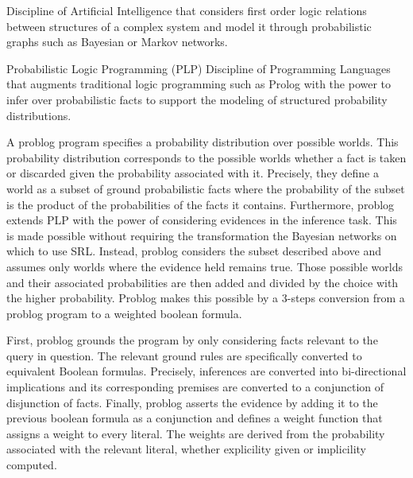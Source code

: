 \begin{definition}
    Discipline of Artificial Intelligence that considers first order logic relations between 
    structures of a complex system and model it through probabilistic graphs such as Bayesian or 
    Markov networks.
\end{definition}

\begin{definition}{Probabilistic Logic Programming (PLP)}
    Discipline of Programming Languages that augments traditional logic programming such as Prolog 
    with the power to infer over probabilistic facts to support the modeling of structured 
    probability distributions.
\end{definition}

A problog program specifies a probability distribution over possible worlds. 
This probability distribution corresponds to the possible worlds whether a fact is taken 
or discarded given the probability associated with it. Precisely, they define a world 
as a subset of ground probabilistic facts where the probability of the subset is the product of 
the probabilities of the facts it contains.
%
Furthermore, problog extends PLP with the power of considering evidences 
in the inference task. This is made possible without requiring the transformation 
the Bayesian networks on which to use SRL. Instead, problog considers the subset described above 
and assumes only worlds where the evidence held remains true. Those possible worlds and their associated 
probabilities are then added and divided by the choice with the higher probability. Problog makes this 
possible by a 3-steps conversion from a problog program to a weighted boolean formula.

First, problog grounds the program by only considering facts relevant to the query in question. 
The relevant ground rules are specifically converted to equivalent Boolean formulas. 
Precisely, inferences are converted into bi-directional implications and its corresponding premises 
are converted to a conjunction of disjunction of facts. 
Finally, problog asserts the evidence by adding it to the previous boolean formula 
as a conjunction and defines a weight function that assigns a weight to every literal. 
The weights are derived from the probability associated with the relevant literal, whether explicility 
given or implicility computed. 

